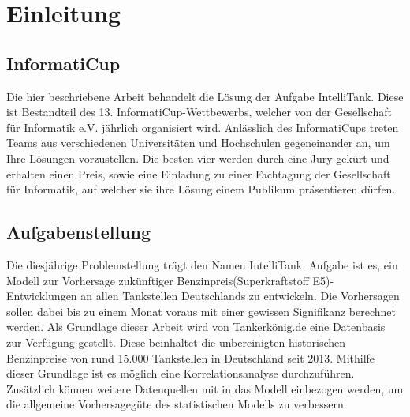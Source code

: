 \documentclass[
ngerman          %
,a4paper          %
,11pt
,pdftex
]{report}
\begin{document}




\setcounter{page}{1}


\chapter{Einleitung}

\section{InformatiCup}

Die hier beschriebene Arbeit behandelt die Lösung der Aufgabe IntelliTank. Diese ist Bestandteil des 13. InformatiCup-Wettbewerbs, welcher von der Gesellschaft für Informatik e.V. jährlich organisiert wird.
Anlässlich des InformatiCups treten Teams aus verschiedenen Universitäten und Hochschulen gegeneinander an, um Ihre Lösungen vorzustellen. Die besten vier werden durch eine Jury gekürt und erhalten einen Preis, sowie eine Einladung zu einer Fachtagung der Gesellschaft für Informatik, auf welcher sie ihre Lösung einem Publikum präsentieren dürfen.

\section{Aufgabenstellung}

Die diesjährige Problemstellung trägt den Namen IntelliTank. Aufgabe ist es, ein Modell zur Vorhersage zukünftiger Benzinpreis(Superkraftstoff E5)-Entwicklungen an allen Tankstellen Deutschlands zu entwickeln. Die Vorhersagen sollen dabei bis zu einem Monat voraus mit einer gewissen Signifikanz berechnet werden. Als Grundlage dieser Arbeit wird von Tankerkönig.de eine Datenbasis zur Verfügung gestellt. Diese beinhaltet die unbereinigten historischen Benzinpreise von rund 15.000 Tankstellen in Deutschland seit 2013. Mithilfe dieser Grundlage ist es möglich eine Korrelationsanalyse durchzuführen. Zusätzlich können weitere Datenquellen mit in das Modell einbezogen werden, um die allgemeine Vorhersagegüte des statistischen Modells zu verbessern.\\
\end{document}
